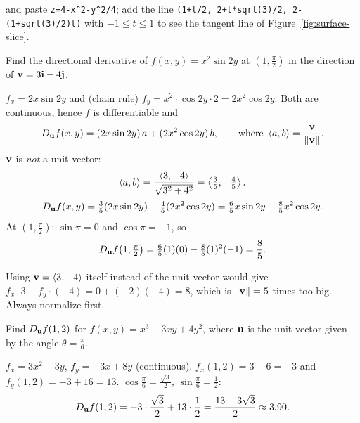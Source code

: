  and paste \texttt{z=4-x\^{}2-y\^{}2/4};
add the line \texttt{(1+t/2, 2+t*sqrt(3)/2, 2-(1+sqrt(3)/2)t)} with
$-1\le t\le1$ to see the tangent line of Figure~\ref{fig:surface-slice}.

\begin{example}\label{ex:6.2}
Find the directional derivative of $f(x,y)=x^2\sin2y$ at $\left(1,\tfrac\pi2\right)$
in the direction of $\mathbf{v}=3\mathbf{i}-4\mathbf{j}$.
\end{example}
\begin{solution}
 $f_x=2x\sin2y$ and (chain rule)
$f_y=x^2\cdot\cos2y\cdot2=2x^2\cos2y$. Both are continuous, hence $f$ is
differentiable and
\[
  D_{\mathbf{u}} f(x,y)=(2x\sin2y)\,a+(2x^2\cos2y)\,b,\qquad\text{where }\left\langle a,b \right\rangle=\frac{\mathbf{v}}{\lVert\mathbf{v}\rVert} .
\]
 $\mathbf{v}$ is \emph{not} a unit vector:
\[
  \left\langle a,b \right\rangle=\frac{\left\langle 3,-4 \right\rangle}{\sqrt{3^2+4^2}}=\left\langle \tfrac35,-\tfrac45 \right\rangle.
\]
\[
  D_{\mathbf{u}} f(x,y)=\tfrac35(2x\sin2y)-\tfrac45(2x^2\cos2y)=\tfrac65x\sin2y-\tfrac85x^2\cos2y .
\]
 At $\left(1,\frac\pi2\right)$: $\sin\pi=0$ and $\cos\pi=-1$, so
\[
  D_{\mathbf{u}} f\!\left(1,\tfrac\pi2\right)=\tfrac65(1)(0)-\tfrac85(1)^2(-1)=\frac85 .
\]
\end{solution}

\begin{warning}
Using $\mathbf{v}=\left\langle 3,-4 \right\rangle$ itself instead of the unit vector would give
$f_x\cdot3+f_y\cdot(-4)=0+(-2)(-4)=8$, which is $\lVert\mathbf{v}\rVert=5$ times too big.
Always normalize first.
\end{warning}

\begin{example}\label{ex:pi6}
Find $D_{\mathbf{u}} f(1,2)$ for $f(x,y)=x^3-3xy+4y^2$, where $\mathbf{u}$ is the unit vector
given by the angle $\theta=\frac\pi6$.
\end{example}
\begin{solution}
 $f_x=3x^2-3y$, $f_y=-3x+8y$ (continuous).
 $f_x(1,2)=3-6=-3$ and $f_y(1,2)=-3+16=13$.
 $\cos\frac\pi6=\frac{\sqrt3}{2}$, $\sin\frac\pi6=\frac12$:
\[
  D_{\mathbf{u}} f(1,2)=-3\cdot\frac{\sqrt3}{2}+13\cdot\frac12=\frac{13-3\sqrt3}{2}\approx3.90 .
\]
\end{solution}

